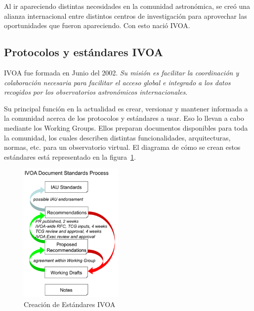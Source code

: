 Al ir apareciendo distintas necesidades en la comunidad astronómica, se creó una alianza internacional entre 
distintos centros de investigación para aprovechar las oportunidades que fueron
apareciendo. Con esto nació IVOA.

\subsection{Protocolos y estándares IVOA}

IVOA fue formada en Junio del 2002.  \emph{Su misión es facilitar la
coordinación y colaboración necesaria para facilitar el acceso global e
integrado a los datos recogidos por los observatorios astronómicos
internacionales}.

Su principal función en la actualidad es crear, versionar y mantener informada
a la comunidad acerca de los protocolos y estándares \cite{ivoa_documents} a
usar.  Eso lo llevan a cabo mediante los Working Groups. Ellos preparan
documentos disponibles para toda la comunidad, los cuales describen distintas
funcionalidades, arquitecturas, normas, etc. para un observatorio virtual.
El diagrama de cómo se crean estos estándares está representado
en la figura~\ref{fig:creacionestandares}.
\begin{figure}[h!t]
        \centering
         \includegraphics[width=0.45\textwidth]{img/diagrama_proceso.png}
         \caption{Creación de Estándares IVOA}
        \label{fig:creacionestandares}
\end{figure}

